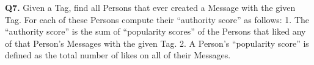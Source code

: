 \textbf{Q7.}
Given a Tag, find all Persons that ever created a Message with the given
Tag. For each of these Persons compute their ``authority score'' as
follows: 1.  The ``authority score'' is the sum of ``popularity scores'' of the
  Persons that liked any of that Person's Messages with the given Tag. 2. A Person's ``popularity score'' is defined as the total number of  likes on all of their Messages.
